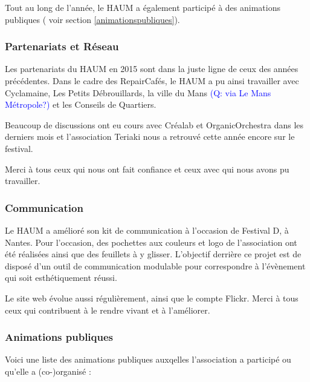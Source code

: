 \documentclass[11pt]{article}
\newcommand{\f}[1]{\textcolor{blue}{#1}}
\begin{document}
Tout au long de l'année, le HAUM a également participé à des animations publiques ( voir section \ref{animationspubliques}).


\subsubsection{Partenariats et Réseau}

Les partenariats du HAUM en 2015 sont dans la juste ligne de ceux des années précédentes. Dans le cadre des
RepairCafés, le HAUM a pu ainsi travailler avec Cyclamaine, Les Petits Débrouillards, la ville du Mans \f{(Q: via Le Mans M\'etropole?)}
et les Conseils de Quartiers.

Beaucoup de discussions ont eu cours avec Créalab et OrganicOrchestra dans les derniers mois et l'association Teriaki
nous a retrouvé cette année encore sur le festival.

Merci à tous ceux qui nous ont fait confiance et ceux avec qui nous avons pu travailler.

\subsubsection{Communication}

Le HAUM a amélioré son kit de communication à l'occasion de Festival D, à Nantes. Pour l'occasion, des pochettes aux
couleurs et logo de l'association ont été réalisées ainsi que des feuillets à y glisser. L'objectif derrière ce projet
est de disposé d'un outil de communication modulable pour correspondre à l'évènement qui soit esthétiquement réussi.

Le site web évolue aussi régulièrement, ainsi que le compte Flickr. Merci à tous ceux qui contribuent à le rendre vivant et à l'améliorer.

\subsubsection{Animations publiques \label{animationspubliques}}
 
Voici une liste des animations publiques auxqelles l'association a participé ou qu'elle a (co-)organisé :
\end{document}
